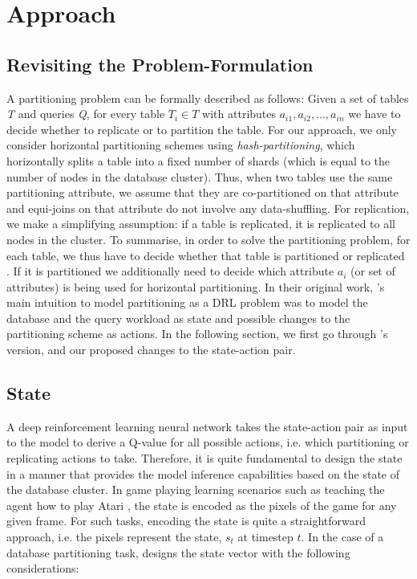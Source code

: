 \chapter{Approach}
\label{Methods}

\section{Revisiting the Problem-Formulation}
A partitioning problem can be formally described as follows: Given a set of tables \textit{T} and queries \textit{Q}, for every table $T_i \in T$ with attributes $a_{i1},a_{i2},...,a_{in}$ we have to decide whether to replicate or to partition the table. For our approach, we only consider horizontal partitioning schemes using \textit{hash-partitioning}, which horizontally splits a table into a fixed number of shards (which is equal to the number of nodes in the database cluster). Thus, when two tables use the same partitioning attribute, we assume that they are co-partitioned on that attribute and equi-joins on that attribute do not involve any data-shuffling. For replication, we make a simplifying assumption: if a table is replicated, it is replicated to all nodes in the cluster. 
To summarise, in order to solve the partitioning problem, for each table, we thus have to decide whether that table is partitioned or replicated \cite{Hilprecht:2019:TLP:3329859.3329876}. If it is partitioned we additionally need to decide which attribute $a_i$ (or set of attributes) is being used for horizontal partitioning.
In their original work, \citeauthor{Hilprecht:2019:TLP:3329859.3329876}'s main intuition to model partitioning as a DRL problem was to model the database and the query workload as state and possible changes to the partitioning scheme as actions. In the following section, we first go through \citeauthor{Hilprecht:2019:TLP:3329859.3329876}'s version, and our proposed changes to the state-action pair.

\section{State}
A deep reinforcement learning neural network takes the state-action pair as input to the model to derive a Q-value for all possible actions, i.e. which partitioning or replicating actions to take. Therefore, it is quite fundamental to design the state in a manner that provides the model inference capabilities based on the state of the database cluster. In game playing learning scenarios such as teaching the agent how to play Atari \cite{DBLP:journals/corr/MnihKSGAWR13}, the state is encoded as the pixels of the game for any given frame. For such tasks, encoding the state is quite a straightforward approach, i.e. the pixels represent the state, $s_t$ at timestep $t$. In the case of a database partitioning task, \citeauthor{Hilprecht:2019:TLP:3329859.3329876} designs the state vector with the following considerations:

